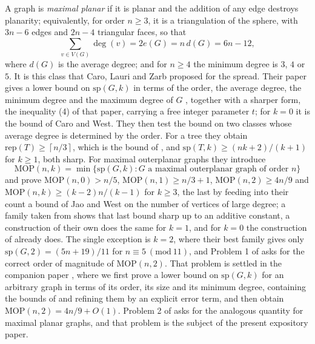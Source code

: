 \documentclass[10pt,a4paper]{article}
\begin{document}


A graph is \emph{maximal planar} if it is planar and the addition of any edge destroys planarity;
equivalently, for order $n\geq 3$, it is a triangulation of the sphere, with $3n-6$ edges and $2n-4$
triangular faces, so that
\[
\sum_{v\in V(G)}\deg (v)=2e(G)=n\,d(G)=6n-12 ,
\]
where $d(G)$ is the average degree; and for $n\geq 4$ the minimum degree is $3$, $4$ or $5$. It is this class that Caro, Lauri and Zarb proposed for the spread. Their paper
\cite{CaroLauriZarb} gives a lower bound on $\mathrm{sp}(G,k)$ in terms of the order, the average
degree, the minimum degree and the maximum degree of $G$ \cite[Theorem 2.1]{CaroLauriZarb}, together
with a sharper form, the inequality (4) of that paper, carrying a free integer parameter $t$; for
$k=0$ it is the bound of Caro and West. They then test the bound on two classes whose average degree
is determined by the order. For a tree they obtain $\mathrm{rep}(T)\geq \left\lceil n/3\right\rceil $,
which is the bound of \cite{CaroWest}, and $\mathrm{sp}(T,k)\geq (nk+2)/(k+1)$ for $k\geq 1$, both
sharp. For maximal outerplanar graphs they introduce
\[
\mathrm{MOP}(n,k)=\min \{\mathrm{sp}(G,k):G\text{ a maximal outerplanar graph of order }n\}
\]
and prove $\mathrm{MOP}(n,0)>n/5$, $\mathrm{MOP}(n,1)\geq n/3+1$, $\mathrm{MOP}(n,2)\geq 4n/9$ and
$\mathrm{MOP}(n,k)\geq (k-2)n/(k-1)$ for $k\geq 3$, the last by feeding into their count a bound of Jao
and West \cite{JaoWest} on the number of vertices of large degree; a family taken from
\cite{JaoWest} shows that last bound sharp up to an additive constant, a construction of their own does
the same for $k=1$, and for $k=0$ the construction of \cite{CaroWest} already does. The single
exception is $k=2$, where their best family gives only
$\mathrm{sp}(G,2)=(5n+19)/11$ for $n\equiv 5\ (\mathrm{mod}\ 11)$, and Problem 1 of
\cite{CaroLauriZarb} asks for the correct order of magnitude of $\mathrm{MOP}(n,2)$. That problem is
settled in the companion paper \cite{P1}, where we first prove a lower bound on $\mathrm{sp}(G,k)$ for
an arbitrary graph in terms of its order, its size and its minimum degree, containing the bounds of
\cite{CaroLauriZarb,CaroWest} and refining them by an explicit error term, and then obtain
$\mathrm{MOP}(n,2)=4n/9+O(1)$. Problem 2 of \cite{CaroLauriZarb} asks for the analogous quantity for
maximal planar graphs, and that problem is the subject of the present expository paper.
\end{document}

